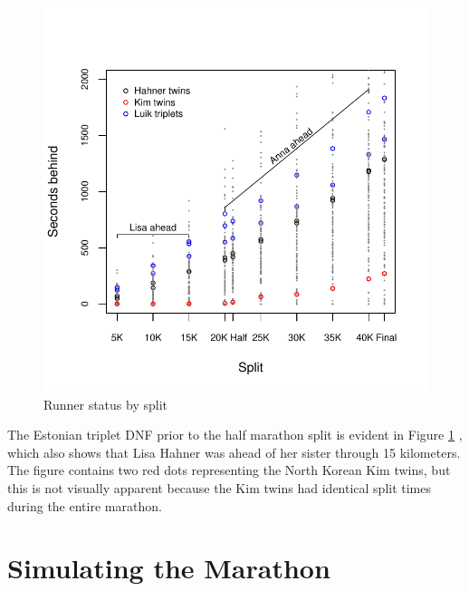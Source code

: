 \documentclass[12pt,titlepage]{article}
\begin{document}
\begin{figure}[!ht]
  \centering
  \caption{Runner status by split}
  \label{fig:secondsbehind}
  \includegraphics[scale = 1]{seconds-behind.pdf}
\end{figure}

The Estonian triplet DNF prior to the half marathon split is evident
in Figure \ref{fig:secondsbehind} , which also shows that Lisa Hahner
was ahead of her sister through 15 kilometers.  The figure contains
two red dots representing the North Korean Kim twins, but this is not
visually apparent because the Kim twins had identical split times
during the entire marathon.

\section*{Simulating the Marathon}

\end{document}
